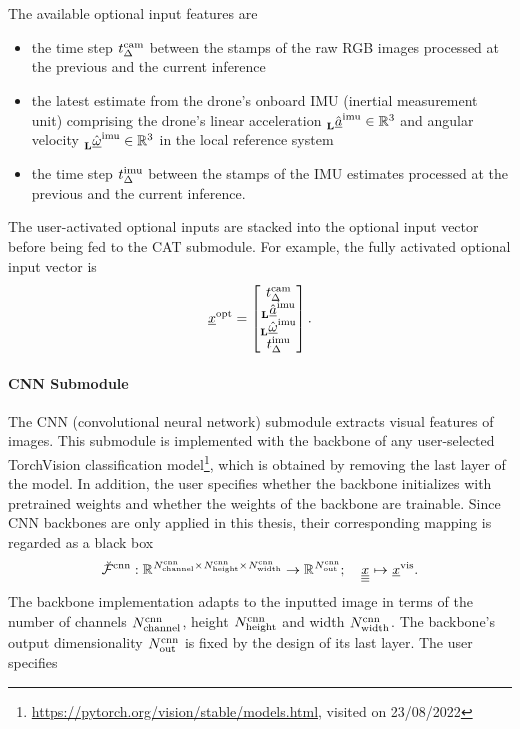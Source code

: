 The available optional input features are
\begin{itemize}
    \item the time step
    $\rawRGBTimeStep$
    between the stamps of the raw RGB images processed
    at the previous and the current inference
    \item the latest estimate from the drone's onboard IMU
    (inertial measurement unit) 
    comprising the drone's linear acceleration
    $\IMULinAcc \in \R{3}$
    and angular velocity
    $\IMUAngVel \in \R{3}$
    in the local reference system
    \item the time step
    $\IMUTimeStep$
    between the stamps of the IMU estimates
    processed at the previous and the current inference.
\end{itemize}
The user-activated optional inputs are stacked into the optional input vector
before being fed to the CAT submodule.
For example, the fully activated optional input vector is
\begin{align} \label{eq:opt_inp_vec}
    \optFeatVec{} =
    \begin{bmatrix}
        \rawRGBTimeStep \\
        \IMULinAcc \\
        \IMUAngVel \\
        \IMUTimeStep
    \end{bmatrix}.
\end{align}








\paragraph*{CNN Submodule} ${}$\\
The CNN (convolutional neural network) submodule 
extracts visual features of images.
This submodule is implemented with the backbone
of any user-selected TorchVision
classification model\footnote{
    \url{https://pytorch.org/vision/stable/models.html}, visited on 23/08/2022
},
which is obtained by removing the last layer of the model.
In addition, the user specifies whether the backbone
initializes with pretrained weights and whether
the weights of the backbone are trainable.
Since CNN backbones are only applied in this thesis, 
their corresponding mapping is 
regarded as a black box 
\begin{align} \label{eq:CNN}
    \CNNMap 
    :
    \R{\CNNNumC \times \CNNHeight \times \CNNWidth} 
    \rightarrow 
    \R{\CNNOutp}
    ;\quad 
    \img[]{}{}{}{}
    \mapsto 
    \visFeatVec{}
    .
\end{align}
The backbone implementation adapts to the inputted image
in terms of 
the number of channels $\CNNNumC$,
height $\CNNHeight$
and width $\CNNWidth$.
The backbone's output dimensionality 
$\CNNOutp$
is fixed by the design of its last layer.
The user specifies

